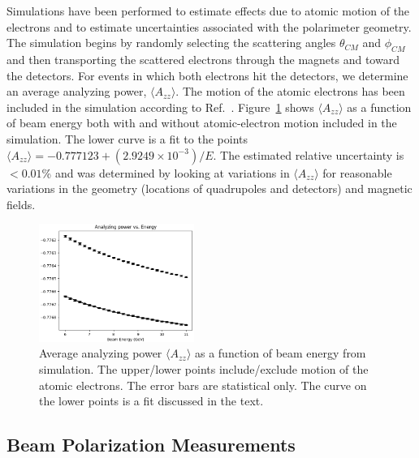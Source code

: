 Simulations have been performed to estimate effects due to atomic motion of the electrons and to estimate
uncertainties associated with the polarimeter geometry. The simulation begins by randomly selecting the
scattering angles $\theta_{CM}$ and $\phi_{CM}$ and then transporting the scattered electrons through the
magnets and toward the detectors. For events in which both electrons hit the detectors, we determine an
average analyzing power, $\langle A_{zz}\rangle$. The motion of the atomic electrons has been included in the
simulation according to Ref.~\cite{levchuk94}. Figure~\ref{fig-Azz} shows $\langle A_{zz}\rangle$ as a function
of beam energy both with and without atomic-electron motion included in the simulation. The lower curve is a fit
to the points $\langle A_{zz}\rangle= -0.777123+(2.9249\times 10^{-3})/E$. The estimated relative uncertainty
is $<0.01$\% and was determined by looking at variations in $\langle A_{zz}\rangle$ for reasonable variations in
the geometry (locations of quadrupoles and detectors) and magnetic fields.
\begin{figure}[ht]
 \begin{center}
  \includegraphics[width=0.45\textwidth]{Azz.png}
 \end{center}
 \caption{Average analyzing power $\langle A_{zz}\rangle$ as a function of beam energy from simulation. The
   upper/lower points include/exclude motion of the atomic electrons. The error bars are statistical only. The
   curve on the lower points is a fit discussed in the text.}
 \label{fig-Azz}
\end{figure}

\subsection{Beam Polarization Measurements}
\label{sec-SpinDance}

